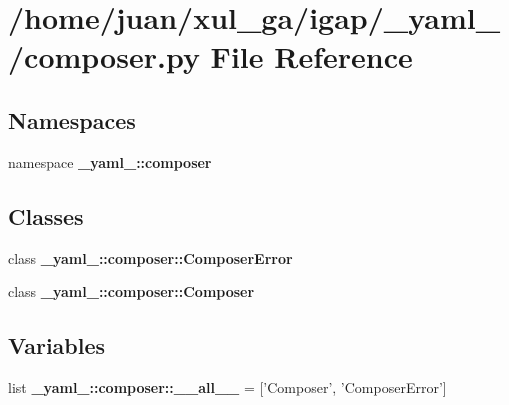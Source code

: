 \section{/home/juan/xul\_\-ga/igap/\_\-yaml\_\-/composer.py File Reference}
\label{composer_8py}
\subsection*{Namespaces}
\begin{CompactItemize}
\item 
namespace {\bf \_\-yaml\_\-::composer}
\end{CompactItemize}
\subsection*{Classes}
\begin{CompactItemize}
\item 
class {\bf \_\-yaml\_\-::composer::ComposerError}
\item 
class {\bf \_\-yaml\_\-::composer::Composer}
\end{CompactItemize}
\subsection*{Variables}
\begin{CompactItemize}
\item 
list {\bf \_\-yaml\_\-::composer::\_\-\_\-all\_\-\_\-} = ['Composer', 'ComposerError']
\end{CompactItemize}
